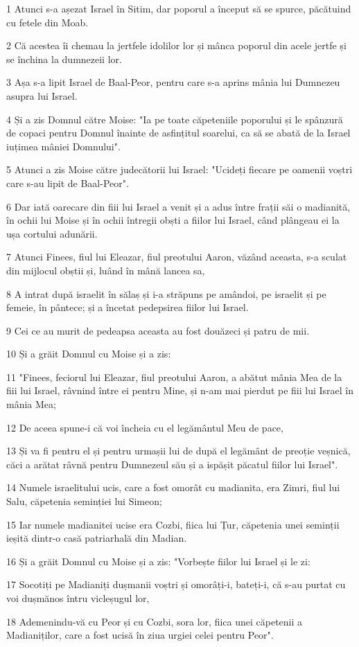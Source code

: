 \par 1 Atunci s-a așezat Israel în Sitim, dar poporul a început să se spurce, păcătuind cu fetele din Moab.
\par 2 Că acestea îi chemau la jertfele idolilor lor și mânca poporul din acele jertfe și se închina la dumnezeii lor.
\par 3 Așa s-a lipit Israel de Baal-Peor, pentru care s-a aprins mânia lui Dumnezeu asupra lui Israel.
\par 4 Și a zis Domnul către Moise: "Ia pe toate căpeteniile poporului și le spânzură de copaci pentru Domnul înainte de asfințitul soarelui, ca să se abată de la Israel iuțimea mâniei Domnului".
\par 5 Atunci a zis Moise către judecătorii lui Israel: "Ucideți fiecare pe oamenii voștri care s-au lipit de Baal-Peor".
\par 6 Dar iată oarecare din fiii lui Israel a venit și a adus între frații săi o madianită, în ochii lui Moise și în ochii întregii obști a fiilor lui Israel, când plângeau ei la ușa cortului adunării.
\par 7 Atunci Finees, fiul lui Eleazar, fiul preotului Aaron, văzând aceasta, s-a sculat din mijlocul obștii și, luând în mână lancea sa,
\par 8 A intrat după israelit în sălaș și i-a străpuns pe amândoi, pe israelit și pe femeie, în pântece; și a încetat pedepsirea fiilor lui Israel.
\par 9 Cei ce au murit de pedeapsa aceasta au fost douăzeci și patru de mii.
\par 10 Și a grăit Domnul cu Moise și a zis:
\par 11 "Finees, feciorul lui Eleazar, fiul preotului Aaron, a abătut mânia Mea de la fiii lui Israel, râvnind între ei pentru Mine, și n-am mai pierdut pe fiii lui Israel în mânia Mea;
\par 12 De aceea spune-i că voi încheia cu el legământul Meu de pace,
\par 13 Și va fi pentru el și pentru urmașii lui de după el legământ de preoție veșnică, căci a arătat râvnă pentru Dumnezeul său și a ispășit păcatul fiilor lui Israel".
\par 14 Numele israelitului ucis, care a fost omorât cu madianita, era Zimri, fiul lui Salu, căpetenia seminției lui Simeon;
\par 15 Iar numele madianitei ucise era Cozbi, fiica lui Țur, căpetenia unei seminții ieșită dintr-o casă patriarhală din Madian.
\par 16 Și a grăit Domnul cu Moise și a zis: "Vorbește fiilor lui Israel și le zi:
\par 17 Socotiți pe Madianiți dușmanii voștri și omorâți-i, bateți-i, că s-au purtat cu voi dușmănos întru vicleșugul lor,
\par 18 Ademenindu-vă cu Peor și cu Cozbi, sora lor, fiica unei căpetenii a Madianiților, care a fost ucisă în ziua urgiei celei pentru Peor".

